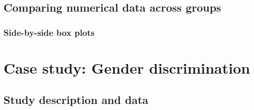 \documentclass[slidestop,compress,mathserif]{beamer}
\begin{document}

\subsection{Comparing numerical data across groups}


\begin{frame}
\frametitle{Side-by-side box plots}


\begin{center}
\end{center}

\end{frame}



\section{Case study: Gender discrimination}


\subsection{Study description and data}

\end{document}
